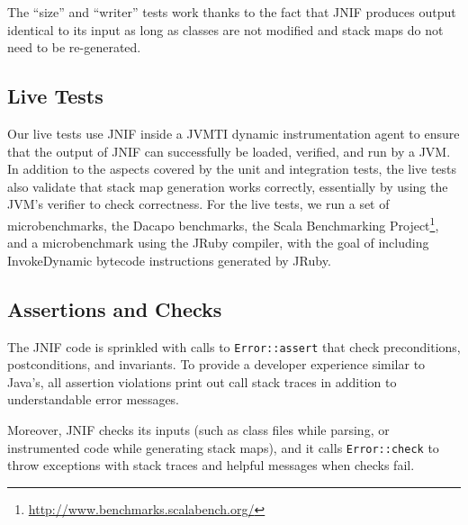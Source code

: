 The ``size'' and ``writer'' tests work thanks to the fact that 
JNIF produces output identical to its input 
as long as classes are not modified and stack maps do not need to be re-generated.

%



\subsection{Live Tests}

Our live tests use JNIF inside a JVMTI dynamic instrumentation agent
to ensure that the output of JNIF can successfully be loaded, verified, and run by a JVM.
In addition to the aspects covered by the unit and integration tests,
the live tests also validate that stack map generation works correctly,
essentially by using the JVM's verifier to check correctness.
%
For the live tests, we run a set of microbenchmarks, 
the Dacapo benchmarks, 
the Scala Benchmarking Project\footnote{\url{http://www.benchmarks.scalabench.org/}},
and a microbenchmark using the JRuby compiler,
with the goal of including InvokeDynamic bytecode instructions generated by JRuby.




\subsection{Assertions and Checks}

The JNIF code is sprinkled with calls to \texttt{Error::assert} 
that check preconditions, postconditions, and invariants.
To provide a developer experience similar to Java's,
all assertion violations print out call stack traces in addition to understandable error messages.

Moreover, JNIF checks its inputs (such as class files while parsing, or instrumented code while generating stack maps),
and it calls \texttt{Error::check} to throw exceptions with stack traces and helpful messages
when checks fail. 

